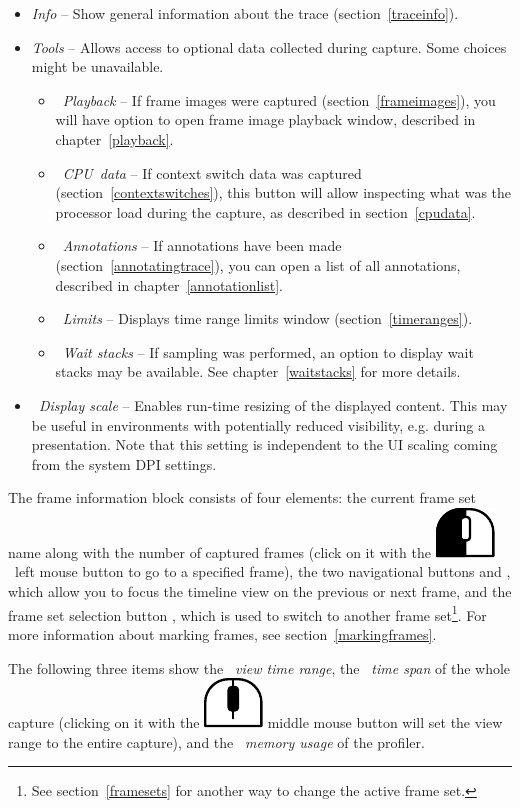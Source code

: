 \documentclass[hidelinks,titlepage,a4paper]{article}
\newcommand{\LMB}{\includegraphics[height=.8\baselineskip]{icons/lmb}}
\newcommand{\MMB}{\includegraphics[height=.8\baselineskip]{icons/mmb}}
\begin{document}
\begin{itemize}
\item \emph{\faFingerprint{} Info} -- Show general information about the trace (section~\ref{traceinfo}).
\item \emph{\faTools{} Tools} -- Allows access to optional data collected during capture. Some choices might be unavailable.
\begin{itemize}
\item \emph{\faPlay{}~Playback} -- If frame images were captured (section~\ref{frameimages}), you will have option to open frame image playback window, described in chapter~\ref{playback}.
\item \emph{\faSlidersH{}~CPU~data} -- If context switch data was captured (section~\ref{contextswitches}), this button will allow inspecting what was the processor load during the capture, as described in section~\ref{cpudata}.
\item \emph{\faStickyNote{}~Annotations} -- If annotations have been made (section~\ref{annotatingtrace}), you can open a list of all annotations, described in chapter~\ref{annotationlist}.
\item \emph{\faRuler{}~Limits} -- Displays time range limits window (section~\ref{timeranges}).
\item \emph{\faHourglassHalf{}~Wait stacks} -- If sampling was performed, an option to display wait stacks may be available. See chapter~\ref{waitstacks} for more details.
\end{itemize}
\item \emph{\faSearchPlus{}~Display scale} -- Enables run-time resizing of the displayed content. This may be useful in environments with potentially reduced visibility, e.g. during a presentation. Note that this setting is independent to the UI scaling coming from the system DPI settings.
\end{itemize}

The frame information block consists of four elements: the current frame set name along with the number of captured frames (click on it with the \LMB{}~left mouse button to go to a specified frame), the two navigational buttons \faCaretLeft{} and \faCaretRight{}, which allow you to focus the timeline view on the previous or next frame, and the frame set selection button \faCaretDown{}, which is used to switch to another frame set\footnote{See section~\ref{framesets} for another way to change the active frame set.}. For more information about marking frames, see section~\ref{markingframes}.

The following three items show the \emph{\faEye{}~view time range}, the \emph{\faDatabase{}~time span} of the whole capture (clicking on it with the \MMB{} middle mouse button will set the view range to the entire capture), and the \emph{\faMemory{}~memory usage} of the profiler.
\end{document}
